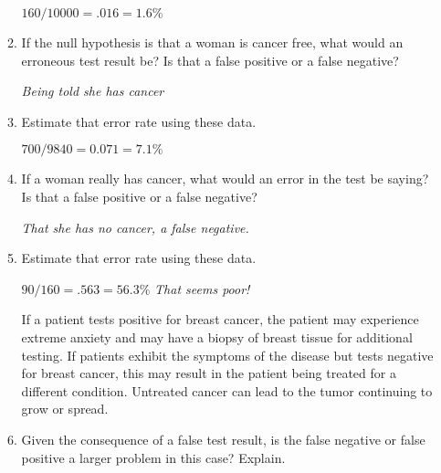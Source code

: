 \begin{enumerate}
\begin{enumerate}
\begin{key}
  $160/10000 = .016 = 1.6\%$
\end{key}
   \item   If the null hypothesis is that a woman is cancer free, what
     would an erroneous test result be?  Is that a false positive or a false
     negative? 
\begin{students}
  \vspace{\fill}
\end{students} 

\begin{key}
  {\it Being told she has cancer}
\end{key}
   \item  Estimate that error rate using these data. 
\begin{students}
  \vspace{\fill}
\end{students}

\begin{key}
  {  $700/9840 = 0.071 = 7.1\%$}
\end{key}
   \item  If a woman really has cancer, what would an error in the
     test be saying? Is that a false positive or a false
     negative? 
\begin{students}
  \vspace{\fill}
\end{students} 

\begin{key}
    {\it That she has no cancer, a false negative.}
\end{key}
   \item  Estimate that error rate using these data. 
\begin{students}
  \vspace{\fill}
\end{students} 

\begin{key}
{$90/160 =  .563 = 56.3\%$ \it That seems poor! }
\end{key}

If a patient tests positive for breast cancer, the patient may
experience extreme anxiety and may have a biopsy of breast tissue for
additional testing.  If patients exhibit the symptoms of the disease
but tests negative for breast cancer, this may result in the patient
being treated for a different condition. Untreated cancer can lead to
the tumor continuing to grow or spread. 
\item  Given the consequence of a false test result, is the
  false negative or false positive a larger problem in this case? Explain. 
\begin{students}
  \vspace{\fill}
\end{students} 


\end{enumerate}
\end{enumerate}
